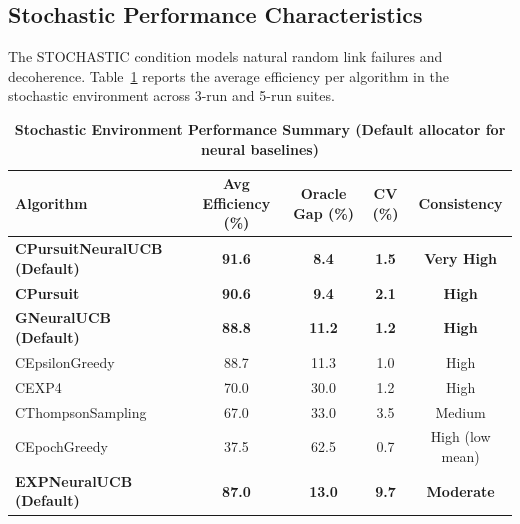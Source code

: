\documentclass[12pt,a4paper]{article}
\newcommand{\stochastic}[1]{\textcolor{stochasticcolor}{\textbf{#1}}}
\newcommand{\legacy}[1]{\textcolor{legacycolor}{\textbf{#1}}}
\newcommand{\neural}[1]{\textcolor{neuralcolor}{\textbf{#1}}}
\begin{document}
\begin{tcolorbox}[colback=stochasticcolor!10,colframe=stochasticcolor,title=\textbf{Stochastic Environment Deep Analysis (1$\times$–2$\times$ Capacities, T/Tb Combined, 3-run/5-run)}]

\subsection{Stochastic Performance Characteristics}

The STOCHASTIC condition models natural random link failures and decoherence. Table~\ref{tab:stoch-performance} reports the average efficiency per algorithm in the stochastic environment across 3-run and 5-run suites.

\begin{table}[H]
\small
\centering
\caption{\stochastic{Stochastic Environment Performance Summary (Default allocator for neural baselines)}}
\label{tab:stoch-performance}
\begin{tabular}{|l|c|c|c|c|}
\hline
\textbf{Algorithm} & \textbf{Avg Efficiency (\%)} & \textbf{Oracle Gap (\%)} & \textbf{CV (\%)} & \textbf{Consistency} \\
\hline
\hline
\neural{CPursuitNeuralUCB (Default)}   & \neural{\textbf{91.6}} & \neural{8.4}  & \neural{1.5}  & \neural{Very High} \\
\stochastic{CPursuit}                  & \stochastic{\textbf{90.6}} & \stochastic{9.4}  & \stochastic{2.1}  & \stochastic{High} \\
\neural{GNeuralUCB (Default)}          & \neural{\textbf{88.8}} & \neural{11.2} & \neural{1.2}  & \neural{High} \\
CEpsilonGreedy                         & 88.7                    & 11.3          & 1.0           & High \\
CEXP4                                  & 70.0                    & 30.0          & 1.2           & High \\
CThompsonSampling                      & 67.0                    & 33.0          & 3.5           & Medium \\
CEpochGreedy                           & 37.5                    & 62.5          & 0.7           & High (low mean) \\
\legacy{EXPNeuralUCB (Default)}        & \legacy{87.0}           & \legacy{13.0} & \legacy{9.7}  & \legacy{Moderate} \\
\hline
\end{tabular}
\end{table}


\end{tcolorbox}
\end{document}
